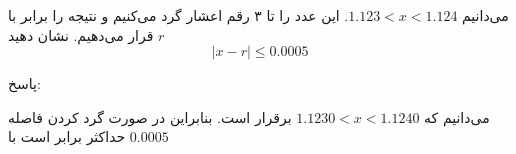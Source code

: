 می‌دانیم
$ 1.123 < x < 1.124$.
این عدد را تا ۳ رقم اعشار گرد می‌کنیم و نتیجه را برابر با $r$ قرار می‌دهیم. نشان دهید 
$$|x - r| \leq 0.0005$$


پاسخ:

می‌دانیم که 
$1.1230 < x < 1.1240$
برقرار است.  بنابراین در صورت گرد کردن فاصله حداکثر برابر است با
$0.0005$